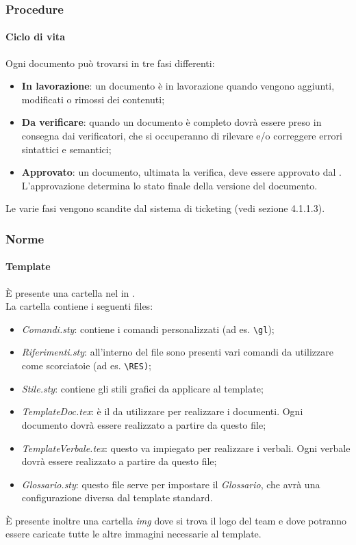 \subsubsection{Procedure}
	\paragraph{Ciclo di vita}
	Ogni documento può trovarsi in tre fasi differenti:
	\begin{itemize}
		\item \textbf{In lavorazione}: un documento è in lavorazione quando vengono aggiunti, modificati o rimossi dei contenuti;
		\item \textbf{Da verificare}: quando un documento è completo dovrà essere preso in consegna dai verificatori, che si occuperanno di rilevare e/o correggere errori sintattici e semantici;
		\item \textbf{Approvato}: un documento, ultimata la verifica, deve essere approvato dal \RES. L'approvazione determina lo stato finale della versione del documento.
	\end{itemize}
	Le varie fasi vengono scandite dal sistema di ticketing (vedi sezione 4.1.1.3).
\subsubsection{Norme}
	\paragraph{Template}
	È presente una cartella nel  in . \\
	La cartella contiene i seguenti files:
	\begin{itemize}
		\item \textit{Comandi.sty}: contiene i comandi personalizzati (ad es. \texttt {\textbackslash gl});
		\item \textit{Riferimenti.sty}: all'interno del file sono presenti vari comandi da utilizzare come scorciatoie (ad es. \texttt{\textbackslash RES)};
		\item \textit{Stile.sty}: contiene gli stili grafici da applicare al template;
		\item \textit{TemplateDoc.tex}: è il  da utilizzare per realizzare i documenti. Ogni documento dovrà essere realizzato a partire da questo file;
		\item \textit{TemplateVerbale.tex}: questo  va impiegato per realizzare i verbali. Ogni verbale dovrà essere realizzato a partire da questo file;
		\item \textit{Glossario.sty}: questo file serve per impostare il \textit{Glossario}, che avrà una configurazione diversa dal template standard. %
	\end{itemize}
	È presente inoltre una cartella \textit{img} dove si trova il logo del team e dove potranno essere caricate tutte le altre immagini necessarie al template. 
